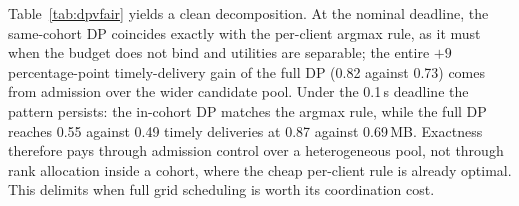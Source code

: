 \documentclass[preprint,12pt]{elsarticle}
\begin{document}
\begin{table}[t]
\centering
\caption{Scheduling arms in the real trainer. Top: nominal 2.0\,s deadline over ten seeds. Bottom: 0.1\,s deadline over five seeds. Both arms of each comparison share the candidate protocol described in the text.}
\label{tab:dpvfair}
\end{table}

Table~\ref{tab:dpvfair} yields a clean decomposition. At the nominal deadline, the same-cohort DP coincides exactly with the per-client argmax rule, as it must when the budget does not bind and utilities are separable; the entire $+9$ percentage-point timely-delivery gain of the full DP (0.82 against 0.73) comes from admission over the wider candidate pool. Under the 0.1\,s deadline the pattern persists: the in-cohort DP matches the argmax rule, while the full DP reaches 0.55 against 0.49 timely deliveries at 0.87 against 0.69\,MB. Exactness therefore pays through admission control over a heterogeneous pool, not through rank allocation inside a cohort, where the cheap per-client rule is already optimal. This delimits when full grid scheduling is worth its coordination cost.
\end{document}

